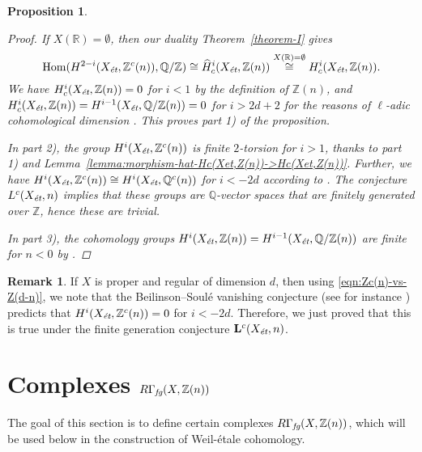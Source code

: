 \documentclass[leqno,12pt]{article}
\theoremstyle{plain}
\newtheorem{proposition}[theorem]{\indent\sc Proposition}
\theoremstyle{definition}
\newtheorem{remark}[theorem]{\indent\sc Remark}
\DeclareMathOperator{\Hom}{Hom}
\newcommand{\QQ}{\mathbb{Q}}
\newcommand{\RR}{\mathbb{R}}
\newcommand{\ZZ}{\mathbb{Z}}
\newcommand{\et}{\text{\it \'{e}t}}
\newcommand{\fg}{\text{\it fg}}
\begin{document}
\begin{proposition}
  \begin{proof}
    If $X (\RR) = \emptyset$, then our duality Theorem~\ref{theorem-I} gives
    \[ \Hom (H^{2-i} (X_\et, \ZZ^c (n)), \QQ/\ZZ) \cong
      \widehat{H}^i_c (X_\et, \ZZ (n)) \stackrel{X(\RR)=\emptyset}{\cong}
      H^i_c (X_\et, \ZZ (n)). \]
    We have $H^i_c (X_\et, \ZZ (n)) = 0$ for $i < 1$ by the definition of
    $\ZZ (n)$, and $H^i_c (X_\et, \ZZ (n)) = H^{i-1} (X_\et, \QQ/\ZZ(n)) = 0$
    for $i > 2d + 2$ for the reasons of $\ell$-adic cohomological dimension
    \cite[Expos\'{e}~X, Th\'{e}or\`{e}me~6.2]{SGA4}. This proves part 1) of the proposition.

    In part 2), the group $H^i (X_\et, \ZZ^c (n))$ is finite $2$-torsion for
    $i > 1$, thanks to part 1) and
    Lemma~\ref{lemma:morphism-hat-Hc(Xet,Z(n))->Hc(Xet,Z(n))}. Further, we have
    $H^i (X_\et, \ZZ^c (n)) \cong H^i (X_\et, \QQ^c (n))$ for $i < -2d$
    according to \cite[Lemma~5.12]{Morin-2014}. The conjecture $L^c (X_\et, n)$
    implies that these groups are $\QQ$-vector spaces that are finitely
    generated over $\ZZ$, hence these are trivial.

    In part 3), the cohomology groups
    $H^i (X_\et, \ZZ (n)) = H^{i-1} (X_\et, \QQ/\ZZ (n))$ are finite for $n < 0$
    by \cite[Theorem~3]{Kahn-2003}.
  \end{proof}
\end{proposition}

\begin{remark}
  If $X$ is proper and regular of dimension $d$, then using
  \eqref{eqn:Zc(n)-vs-Z(d-n)}, we note that the Beilinson--Soul\'{e} vanishing
  conjecture (see for instance \cite[\S 4.3.4]{Kahn-2005}) predicts that
  $H^i (X_\et, \ZZ^c (n)) = 0$ for $i < -2d$. Therefore, we just proved that
  this is true under the finite generation conjecture $\mathbf{L}^c (X_\et, n)$.
\end{remark}


\section{Complexes $R\Gamma_\fg (X, \ZZ(n))$}
\label{sec:RGamma-fg}

The goal of this section is to define certain complexes
$R\Gamma_\fg (X, \ZZ(n))$, which will be used below in the construction of
Weil-\'{e}tale cohomology.
\end{document}
